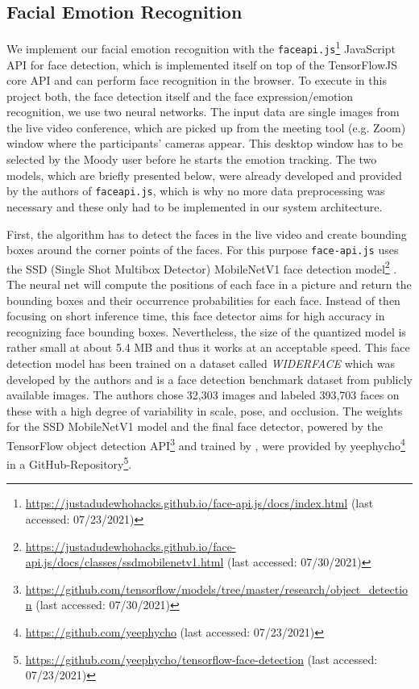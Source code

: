 \subsection{Facial Emotion Recognition}
\label{subsec:method_facial_emotion_recognition}
We implement our facial emotion recognition with the \texttt{faceapi.js}\footnote{\url{https://justadudewhohacks.github.io/face-api.js/docs/index.html} (last accessed: 07/23/2021)} JavaScript API for face detection, which is implemented itself on top of the TensorFlowJS core API and can perform face recognition in the browser. To execute in this project both, the face detection itself and the face expression/emotion recognition, we use two neural networks. The input data are single images from the live video conference, which are picked up from the meeting tool (e.g. Zoom) window where the participants' cameras appear. This desktop window has to be selected by the Moody user before he starts the emotion tracking. The two models, which are briefly presented below, were already developed and provided by the authors of \texttt{faceapi.js}, which is why no more data preprocessing was necessary and these only had to be implemented in our system architecture.

First, the algorithm has to detect the faces in the live video and create bounding boxes around the corner points of the faces. For this purpose \texttt{face-api.js} uses the SSD (Single Shot Multibox Detector) MobileNetV1 face detection model\footnote{\url{https://justadudewhohacks.github.io/face-api.js/docs/classes/ssdmobilenetv1.html} (last accessed: 07/30/2021)} \cite{howard_mobilenets_2017}. The neural net will compute the positions of each face in a picture and return the bounding boxes and their occurrence probabilities for each face. Instead of then focusing on short inference time, this face detector aims for high accuracy in recognizing face bounding boxes. Nevertheless, the size of the quantized model is rather small at about 5.4 MB and thus it works at an acceptable speed. This face detection model has been trained on a dataset called 
\emph{WIDERFACE} which was developed by the authors  and is a face detection benchmark dataset from publicly available images. The authors chose 32,303 images and labeled 393,703 faces on these with a high degree of variability in scale, pose, and occlusion. The weights for the SSD MobileNetV1 model and the final face detector, powered by the TensorFlow object detection API\footnote{\url{https://github.com/tensorflow/models/tree/master/research/object_detection} (last accessed: 07/30/2021)} and trained by , were provided by yeephycho\footnote{\url{https://github.com/yeephycho} (last accessed: 07/23/2021)} in a GitHub-Repository\footnote{\url{https://github.com/yeephycho/tensorflow-face-detection} (last accessed: 07/23/2021)}.

